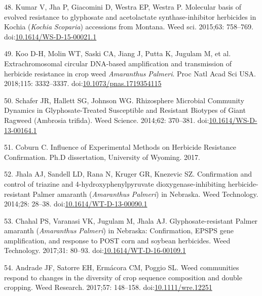 \documentclass[10pt,letterpaper]{article}
\begin{document}
\leavevmode\hypertarget{ref-kumar_molecular_2015}{}%
48. Kumar V, Jha P, Giacomini D, Westra EP, Westra P. Molecular basis of
evolved resistance to glyphosate and acetolactate synthase-inhibitor
herbicides in Kochia (\emph{Kochia} \emph{Scoparia}) accessions from
Montana. Weed sci. 2015;63: 758--769.
doi:\href{https://doi.org/10.1614/WS-D-15-00021.1}{10.1614/WS-D-15-00021.1}

\leavevmode\hypertarget{ref-koo_extrachromosomal_2018}{}%
49. Koo D-H, Molin WT, Saski CA, Jiang J, Putta K, Jugulam M, et al.
Extrachromosomal circular DNA-based amplification and transmission of
herbicide resistance in crop weed \emph{Amaranthus} \emph{Palmeri}. Proc
Natl Acad Sci USA. 2018;115: 3332--3337.
doi:\href{https://doi.org/10.1073/pnas.1719354115}{10.1073/pnas.1719354115}

\leavevmode\hypertarget{ref-schafer_rhizosphere_2014}{}%
50. Schafer JR, Hallett SG, Johnson WG. Rhizosphere Microbial Community
Dynamics in Glyphosate-Treated Susceptible and Resistant Biotypes of
Giant Ragweed (Ambrosia trifida). Weed Science. 2014;62: 370--381.
doi:\href{https://doi.org/10.1614/WS-D-13-00164.1}{10.1614/WS-D-13-00164.1}

\leavevmode\hypertarget{ref-coburn_influence_2017}{}%
51. Coburn C. Influence of Experimental Methods on Herbicide Resistance
Confirmation. Ph.D dissertation, University of Wyoming. 2017.

\leavevmode\hypertarget{ref-jhala_confirmation_2014}{}%
52. Jhala AJ, Sandell LD, Rana N, Kruger GR, Knezevic SZ. Confirmation
and control of triazine and 4-hydroxyphenylpyruvate
dioxygenase-inhibiting herbicide-resistant Palmer amaranth
(\emph{Amaranthus} \emph{Palmeri}) in Nebraska. Weed Technology.
2014;28: 28--38.
doi:\href{https://doi.org/10.1614/WT-D-13-00090.1}{10.1614/WT-D-13-00090.1}

\leavevmode\hypertarget{ref-chahal_glyphosate-resistant_2017}{}%
53. Chahal PS, Varanasi VK, Jugulam M, Jhala AJ. Glyphosate-resistant
Palmer amaranth (\emph{Amaranthus} \emph{Palmeri}) in Nebraska:
Confirmation, EPSPS gene amplification, and response to POST corn and
soybean herbicides. Weed Technology. 2017;31: 80--93.
doi:\href{https://doi.org/10.1614/WT-D-16-00109.1}{10.1614/WT-D-16-00109.1}

\leavevmode\hypertarget{ref-andrade_weed_2017}{}%
54. Andrade JF, Satorre EH, Ermácora CM, Poggio SL. Weed communities
respond to changes in the diversity of crop sequence composition and
double cropping. Weed Research. 2017;57: 148--158.
doi:\href{https://doi.org/10.1111/wre.12251}{10.1111/wre.12251}
\end{document}
